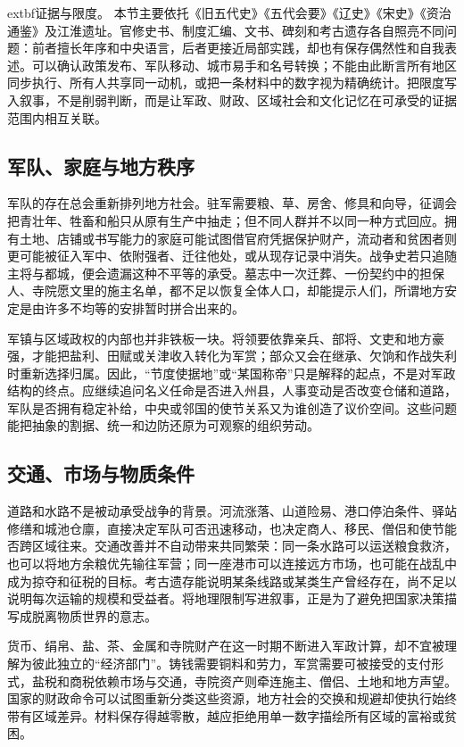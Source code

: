 \noindent	extbf{证据与限度。} 本节主要依托《旧五代史》《五代会要》《辽史》《宋史》《资治通鉴》及江淮遗址。官修史书、制度汇编、文书、碑刻和考古遗存各自照亮不同问题：前者擅长年序和中央语言，后者更接近局部实践，却也有保存偶然性和自我表述。可以确认政策发布、军队移动、城市易手和名号转换；不能由此断言所有地区同步执行、所有人共享同一动机，或把一条材料中的数字视为精确统计。把限度写入叙事，不是削弱判断，而是让军政、财政、区域社会和文化记忆在可承受的证据范围内相互关联。

\subsection{军队、家庭与地方秩序}
军队的存在总会重新排列地方社会。驻军需要粮、草、房舍、修具和向导，征调会把青壮年、牲畜和船只从原有生产中抽走；但不同人群并不以同一种方式回应。拥有土地、店铺或书写能力的家庭可能试图借官府凭据保护财产，流动者和贫困者则更可能被征入军中、依附强者、迁往他处，或从现存记录中消失。战争史若只追随主将与都城，便会遗漏这种不平等的承受。墓志中一次迁葬、一份契约中的担保人、寺院愿文里的施主名单，都不足以恢复全体人口，却能提示人们，所谓地方安定是由许多不均等的安排暂时拼合出来的。

军镇与区域政权的内部也并非铁板一块。将领要依靠亲兵、部将、文吏和地方豪强，才能把盐利、田赋或关津收入转化为军赏；部众又会在继承、欠饷和作战失利时重新选择归属。因此，“节度使据地”或“某国称帝”只是解释的起点，不是对军政结构的终点。应继续追问名义任命是否进入州县，人事变动是否改变仓储和道路，军队是否拥有稳定补给，中央或邻国的使节关系又为谁创造了议价空间。这些问题能把抽象的割据、统一和边防还原为可观察的组织劳动。

\subsection{交通、市场与物质条件}
道路和水路不是被动承受战争的背景。河流涨落、山道险易、港口停泊条件、驿站修缮和城池仓廪，直接决定军队可否迅速移动，也决定商人、移民、僧侣和使节能否跨区域往来。交通改善并不自动带来共同繁荣：同一条水路可以运送粮食救济，也可以将地方余粮优先输往军营；同一座港市可以连接远方市场，也可能在战乱中成为掠夺和征税的目标。考古遗存能说明某条线路或某类生产曾经存在，尚不足以说明每次运输的规模和受益者。将地理限制写进叙事，正是为了避免把国家决策描写成脱离物质世界的意志。

货币、绢帛、盐、茶、金属和寺院财产在这一时期不断进入军政计算，却不宜被理解为彼此独立的“经济部门”。铸钱需要铜料和劳力，军赏需要可被接受的支付形式，盐税和商税依赖市场与交通，寺院资产则牵连施主、僧侣、土地和地方声望。国家的财政命令可以试图重新分类这些资源，地方社会的交换和规避却使执行始终带有区域差异。材料保存得越零散，越应拒绝用单一数字描绘所有区域的富裕或贫困。

